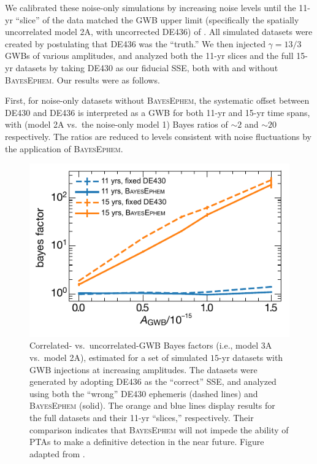\documentclass[iop,apj,twocolappendix]{emulateapj}
\begin{document}
We calibrated these noise-only simulations by increasing noise levels until the 11-yr ``slice'' of the data matched the GWB upper limit (specifically the spatially uncorrelated model 2A, with uncorrected DE436) of \cite{2018ApJ...859...47A}.
All simulated datasets were created by postulating that DE436 was the ``truth.'' We then injected $\gamma = 13/3$ GWBs of various amplitudes, and analyzed both the 11-yr slices and the full 15-yr datasets by taking DE430 as our fiducial SSE, both with and without \textsc{BayesEphem}.
Our results were as follows.

First, for noise-only datasets without \textsc{BayesEphem}, the systematic offset between DE430 and DE436 is interpreted as a GWB for both 11-yr and 15-yr time spans, with (model 2A vs.\ the noise-only model 1) Bayes ratios of $\sim 2$ and $\sim 20$ respectively. The ratios are reduced to levels consistent with noise fluctuations by the application of \textsc{BayesEphem}.
%
\begin{figure}
    \includegraphics{figures/bayesephem_simulations.pdf}
    \caption{Correlated- vs.\ uncorrelated-GWB Bayes factors (i.e., model 3A vs.\ model 2A), estimated for a set of simulated $15$-yr datasets with GWB injections at increasing amplitudes.
    The datasets were generated by adopting DE436 as the ``correct'' SSE, and analyzed using both the ``wrong'' DE430 ephemeris (dashed lines) and \textsc{BayesEphem} (solid). The orange and blue lines display results for the full datasets and their 11-yr ``slices,'' respectively.
    Their comparison indicates that \textsc{BayesEphem} will not impede the ability of PTAs to make a definitive detection in the near future.
    Figure adapted from \cite{2018ApJ...859...47A}.
    \label{fig:simulations}}
\end{figure}
\end{document}
